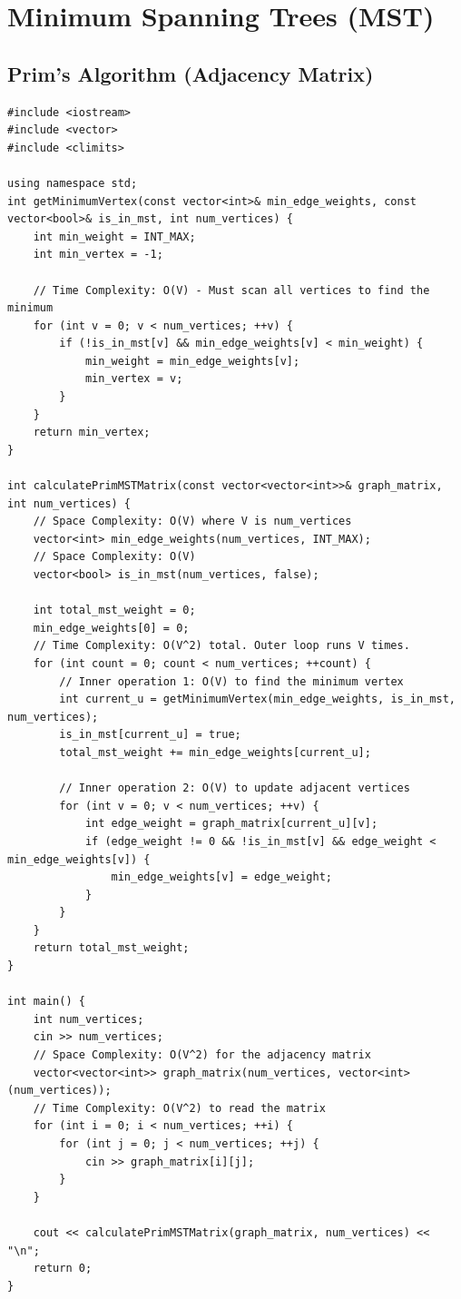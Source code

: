 \section{Minimum Spanning Trees (MST)}

\subsection{Prim's Algorithm (Adjacency Matrix)}
\begin{lstlisting}
#include <iostream>
#include <vector>
#include <climits>

using namespace std;
int getMinimumVertex(const vector<int>& min_edge_weights, const vector<bool>& is_in_mst, int num_vertices) {
    int min_weight = INT_MAX;
    int min_vertex = -1;
    
    // Time Complexity: O(V) - Must scan all vertices to find the minimum
    for (int v = 0; v < num_vertices; ++v) {
        if (!is_in_mst[v] && min_edge_weights[v] < min_weight) {
            min_weight = min_edge_weights[v];
            min_vertex = v;
        }
    }
    return min_vertex;
}

int calculatePrimMSTMatrix(const vector<vector<int>>& graph_matrix, int num_vertices) {
    // Space Complexity: O(V) where V is num_vertices
    vector<int> min_edge_weights(num_vertices, INT_MAX);
    // Space Complexity: O(V)
    vector<bool> is_in_mst(num_vertices, false);         
    
    int total_mst_weight = 0;
    min_edge_weights[0] = 0;
    // Time Complexity: O(V^2) total. Outer loop runs V times.
    for (int count = 0; count < num_vertices; ++count) {
        // Inner operation 1: O(V) to find the minimum vertex
        int current_u = getMinimumVertex(min_edge_weights, is_in_mst, num_vertices);
        is_in_mst[current_u] = true;
        total_mst_weight += min_edge_weights[current_u];
        
        // Inner operation 2: O(V) to update adjacent vertices
        for (int v = 0; v < num_vertices; ++v) {
            int edge_weight = graph_matrix[current_u][v];
            if (edge_weight != 0 && !is_in_mst[v] && edge_weight < min_edge_weights[v]) {
                min_edge_weights[v] = edge_weight;
            }
        }
    }
    return total_mst_weight;
}

int main() {
    int num_vertices;
    cin >> num_vertices;
    // Space Complexity: O(V^2) for the adjacency matrix
    vector<vector<int>> graph_matrix(num_vertices, vector<int>(num_vertices));
    // Time Complexity: O(V^2) to read the matrix
    for (int i = 0; i < num_vertices; ++i) {
        for (int j = 0; j < num_vertices; ++j) {
            cin >> graph_matrix[i][j];
        }
    }
    
    cout << calculatePrimMSTMatrix(graph_matrix, num_vertices) << "\n";
    return 0;
}
\end{lstlisting}

